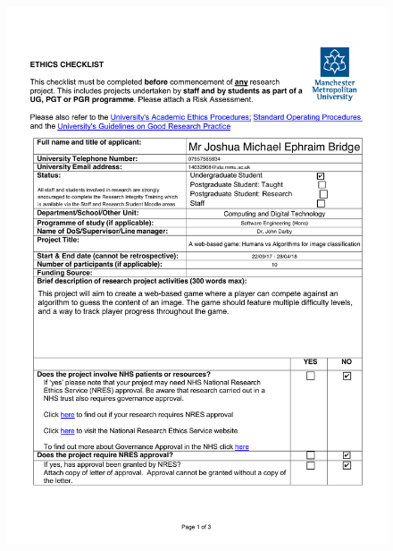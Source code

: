 \documentclass[a4paper,12pt]{report}
\begin{document}
\begin{appendices}
    \begin{figure}[h]
      \centering
      \includegraphics[scale=0.8]{ethics-checklist-1}
    \end{figure}


\end{appendices}
\end{document}
